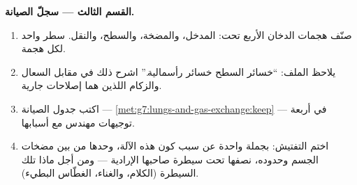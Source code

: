 \begin{problem}
\medskip\noindent\textbf{القسم الثالث --- سجلّ
الصيانة.}
\begin{enumerate}[resume]
  \item صنّف هجمات الدخان الأربع تحت: المدخل، والمضخة، والسطح،
        والنقل. سطر واحد لكل هجمة.
  \item يلاحظ الملف: ``خسائر السطح خسائر رأسمالية.'' اشرح ذلك في
        مقابل السعال والزكام اللذين هما إصلاحات جارية.
  \item اكتب جدول الصيانة ---
        \cref{met:g7:lungs-and-gas-exchange:keep} --- في أربعة
        توجيهات مهندس مع أسبابها.
  \item اختم التفتيش: بجملة واحدة عن سبب كون هذه الآلة، وحدها من
        بين مضخات الجسم وحدوده، نصفها تحت سيطرة صاحبها الإرادية
        --- ومن أجل ماذا تلك السيطرة (الكلام، والغناء، 
        الغطّاس البطيء).
\end{enumerate}
\end{problem}
